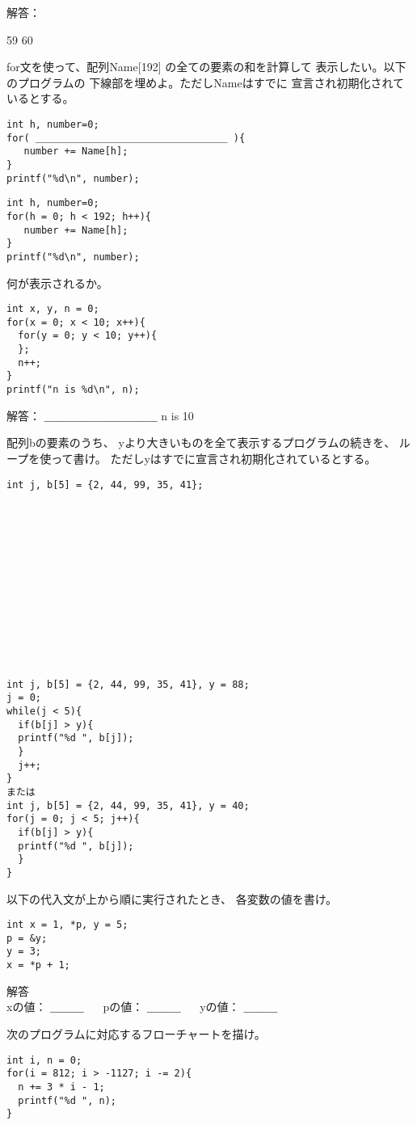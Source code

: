 \documentclass[a4j]{jarticle}
\def\ans#1#2{
\ifnum \anss=1
#1
\else
#2
\fi
}
\newcounter{toi}
\def\toi{%
\bigskip\bigskip\noindent
\shadowbox{\bfseries\large 問題\thetoi}
\addtocounter{toi}{1}
}
\begin{document}
\begin{multicols*}{2}
\noindent
解答：\ans{}{{ 59 60}}



\toi
for文を使って、配列{\ttfamily Name[192]}
の全ての要素の和を計算して
表示したい。以下のプログラムの
下線部を埋めよ。ただし{\ttfamily Name}はすでに
宣言され初期化されているとする。

\ifnum {}
\begin{verbatim}
int h, number=0;
for( ＿＿＿＿＿＿＿＿＿＿＿＿＿＿＿＿＿＿＿＿ ){
   number += Name[h];
}
printf("%d\n", number);
\end{verbatim}
\else
\begin{verbatim}
int h, number=0;
for(h = 0; h < 192; h++){
   number += Name[h];
}
printf("%d\n", number);
\end{verbatim}
\fi


\toi
何が表示されるか。
\begin{verbatim}
int x, y, n = 0;
for(x = 0; x < 10; x++){
  for(y = 0; y < 10; y++){
  };
  n++;
}
printf("n is %d\n", n);
\end{verbatim}
解答：\ans{＿＿＿＿＿＿＿＿＿＿}{{\ttfamily n is 10}}




\toi
配列{\ttfamily b}の要素のうち、
{\ttfamily y}より大きいものを全て表示するプログラムの続きを、
ループを使って書け。
ただし{\ttfamily y}はすでに宣言され初期化されているとする。
\ifnum {}
\begin{verbatim}
int j, b[5] = {2, 44, 99, 35, 41};














\end{verbatim}
\else
\begin{verbatim}
int j, b[5] = {2, 44, 99, 35, 41}, y = 88;
j = 0;
while(j < 5){
  if(b[j] > y){
  printf("%d ", b[j]);
  }
  j++;
}
または
int j, b[5] = {2, 44, 99, 35, 41}, y = 40;
for(j = 0; j < 5; j++){
  if(b[j] > y){
  printf("%d ", b[j]);
  }
}
\end{verbatim}
\fi


\toi
以下の代入文が上から順に実行されたとき、
各変数の値を書け。
\begin{verbatim}
int x = 1, *p, y = 5;
p = &y;
y = 3;
x = *p + 1;
\end{verbatim}
\noindent
解答\\
{\ttfamily  x}の値：\ans{＿＿＿}{4}　%
{\ttfamily *p}の値：\ans{＿＿＿}{3}　%
{\ttfamily  y}の値：\ans{＿＿＿}{3}





\toi
次のプログラムに対応するフローチャートを描け。
\begin{verbatim}
int i, n = 0;
for(i = 812; i > -1127; i -= 2){
  n += 3 * i - 1;
  printf("%d ", n);
}  
\end{verbatim}





\end{multicols*}
\end{document}
